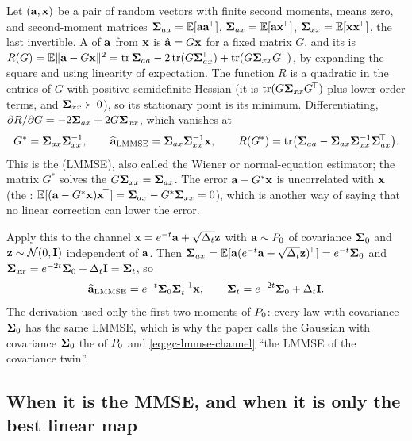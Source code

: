 Let $(\mathbf{a},\mathbf{x})$ be a pair of random vectors with finite second moments, means zero,
and second-moment matrices $\mathbf{\Sigma}_{aa}=\mathbb{E}[\mathbf{a}\mathbf{a}^{\!\top}]$, $\mathbf{\Sigma}_{ax}=\mathbb{E}[\mathbf{a}\mathbf{x}^{\!\top}]$,
$\mathbf{\Sigma}_{xx}=\mathbb{E}[\mathbf{x}\mathbf{x}^{\!\top}]$, the last invertible. A  of $\mathbf{a}$
from $\mathbf{x}$ is $\hat{\mathbf{a}}=G\mathbf{x}$ for a fixed matrix $G$, and its  is
$R(G)=\mathbb{E}\lVert\mathbf{a}-G\mathbf{x}\rVert^2=\operatorname{tr}\mathbf{\Sigma}_{aa}-2\operatorname{tr}(G\mathbf{\Sigma}_{ax}^{\!\top})+\operatorname{tr}(G\mathbf{\Sigma}_{xx}G^{\!\top})$,
by expanding the square and using linearity of expectation. The function $R$ is a
quadratic in the entries of $G$ with positive semidefinite Hessian (it is
$\operatorname{tr}(G\mathbf{\Sigma}_{xx}G^{\!\top})$ plus lower-order terms, and $\mathbf{\Sigma}_{xx}\succ0$), so its
stationary point is its minimum. Differentiating, $\partial R/\partial G=-2\mathbf{\Sigma}_{ax}+2G\mathbf{\Sigma}_{xx}$,
which vanishes at
\begin{equation}
  G^\ast=\mathbf{\Sigma}_{ax}\mathbf{\Sigma}_{xx}^{-1},\qquad
  \widehat{\mathbf{a}}_{\mathrm{LMMSE}}=\mathbf{\Sigma}_{ax}\mathbf{\Sigma}_{xx}^{-1}\mathbf{x},\qquad
  R(G^\ast)=\operatorname{tr}\bigl(\mathbf{\Sigma}_{aa}-\mathbf{\Sigma}_{ax}\mathbf{\Sigma}_{xx}^{-1}\mathbf{\Sigma}_{ax}^{\!\top}\bigr).
  \label{eq:gc-lmmse}
\end{equation}
This is the  (LMMSE), also called the Wiener
or normal-equation estimator; the matrix $G^\ast$ solves the 
$G\mathbf{\Sigma}_{xx}=\mathbf{\Sigma}_{ax}$. The error $\mathbf{a}-G^\ast\mathbf{x}$ is uncorrelated with $\mathbf{x}$ (the
: $\mathbb{E}[(\mathbf{a}-G^\ast\mathbf{x})\mathbf{x}^{\!\top}]=\mathbf{\Sigma}_{ax}-G^\ast\mathbf{\Sigma}_{xx}=0$),
which is another way of saying that no linear correction can lower the error.

Apply this to the channel $\mathbf{x}=e^{-t}\mathbf{a}+\sqrt{\Delta_t}\mathbf{z}$ with $\mathbf{a}\sim P_0$ of covariance
$\mathbf{\Sigma}_0$ and $\mathbf{z}\sim\mathcal{N}\!\left(0,\mathbf{I}\right)$ independent of $\mathbf{a}$. Then
$\mathbf{\Sigma}_{ax}=\mathbb{E}[\mathbf{a}(e^{-t}\mathbf{a}+\sqrt{\Delta_t}\mathbf{z})^{\!\top}]=e^{-t}\mathbf{\Sigma}_0$ and
$\mathbf{\Sigma}_{xx}=e^{-2t}\mathbf{\Sigma}_0+\Delta_t\mathbf{I}=\mathbf{\Sigma}_t$, so
\begin{equation}
  \widehat{\mathbf{a}}_{\mathrm{LMMSE}}=e^{-t}\mathbf{\Sigma}_0\mathbf{\Sigma}_t^{-1}\mathbf{x},\qquad \mathbf{\Sigma}_t=e^{-2t}\mathbf{\Sigma}_0+\Delta_t\mathbf{I}.
  \label{eq:gc-lmmse-channel}
\end{equation}
The derivation used only the first two moments of $P_0$: every law with covariance
$\mathbf{\Sigma}_0$ has the same LMMSE, which is why the paper calls the Gaussian with covariance
$\mathbf{\Sigma}_0$ the  of $P_0$ and \cref{eq:gc-lmmse-channel} ``the LMMSE
of the covariance twin''.

\subsection{When it is the MMSE, and when it is only the best linear map}

